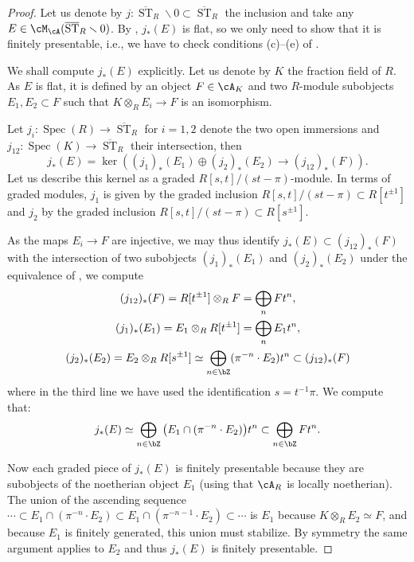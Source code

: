 \documentclass[a4paper]{amsart}
\numberwithin{equation}{section}
\theoremstyle{plain}
\theoremstyle{definition}
\DeclareMathOperator{\Spec}{Spec}
\DeclareMathOperator{\ST}{ST}
\newcommand{\co}{\colon}
\def\oST{\overline{\ST}}
\begin{document}
\begin{proof}
Let us denote by $j\co \oST_R \smallsetminus 0 \subset \oST_R$ the inclusion and take any $E\in \cM_{\cA}(\oST_R \smallsetminus 0)$. By , $j_\ast(E)$ is flat, so we only need to show that it is finitely presentable, i.e., we have to check conditions (c)--(e) of .
	
	We shall compute $j_\ast(E)$ explicitly. Let us denote by $K$ the fraction field of $R$. As $E$ is flat, it is defined by an object $F \in \cA_{K}$ and two $R$-module subobjects $E_1,E_2 \subset F$ such that $K\otimes_R E_i \to F$ is an isomorphism. 
	
	Let $j_i \co \Spec(R) \to \oST_R$ for $i=1,2$ denote the two open immersions and $j_{12} \co \Spec(K) \to \oST_R$ their intersection, then  
	\[
	j_\ast(E) = \ker\left( (j_1)_\ast (E_1) \oplus (j_2)_\ast(E_2) \to (j_{12})_\ast(F) \right).
	\]
	Let us describe this kernel as a graded $R[s,t]/(st-\pi)$-module. In terms of  graded modules, $j_1$ is given by the graded inclusion $R[s,t]/(st-\pi) \subset R[t^{\pm 1}]$ and $j_2$ by the graded inclusion $R[s,t]/(st-\pi) \subset R[s^{\pm 1}]$.
	
	As the maps $E_i \to F$ are injective, we may thus identify $j_\ast(E) \subset (j_{12})_\ast(F)$ with the intersection of two subobjects $(j_1)_*(E_1)$ and $(j_2)_*(E_2)$ under the equivalence of , we compute
	\begin{gather*}
	(j_{12})_\ast(F) = R[t^{\pm 1}] \otimes_R F = \bigoplus_n F t^n, \\
	(j_1)_\ast(E_1) = E_1 \otimes_R R[t^{\pm 1}]= \bigoplus_n E_1 t^n, \\
	(j_2)_\ast(E_2) = E_2 \otimes_R R[s^{\pm 1}] \simeq \bigoplus_{n \in \bZ} (\pi^{-n} \cdot E_2) t^{n} \subset (j_{12})_\ast(F)
	\end{gather*}
	where in the third line we have used the identification $s = t^{-1} \pi$. We compute that:
	$$j_\ast(E) \simeq \bigoplus_{n \in \bZ} \big( E_1 \cap (\pi^{-n} \cdot E_2) \big) t^n \subset \bigoplus_{n\in \bZ} F t^n.$$
	
	Now each graded piece of $j_\ast(E)$ is finitely presentable because they are subobjects of the noetherian object $E_1$ (using that $\cA_R$ is locally noetherian). The union of the ascending sequence $\cdots \subset E_1 \cap (\pi^{-n} \cdot E_2) \subset E_1 \cap (\pi^{-n-1} \cdot E_2) \subset \cdots $ is $E_1$ because $K \otimes_R E_2 \simeq F$, and because $E_1$ is finitely generated, this union must stabilize.  By symmetry the same argument applies to $E_2$ and thus $j_\ast(E)$ is finitely presentable.
\end{proof}
\end{document}
